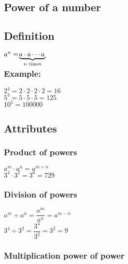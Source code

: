 \documentclass[a4paper]{article}
\begin{document}
\begin{Large}

\section*{Power of a number}

\subsection*{Definition}

$a^n = \smash[b]{\! \underbrace{a \cdot a \cdots{a}\,}_\text{$n$ times}}$

\subsubsection*{Example:}

$2^4 = 2 \cdot 2 \cdot 2 \cdot 2 = 16$ \\[0.05cm]

\noindent $5^3 = 5 \cdot 5 \cdot 5 = 125$ \\[0.05cm]

\noindent $10^5 = 100000$

\subsection*{Attributes}

\subsubsection*{Product of powers}

$a^m \cdot a^n = a^{m+n}$ \\[0.05cm]

\noindent $3^4 \cdot 3^2 = 3^6 = 729$

\subsubsection*{Division of powers}

$a^m \div a^n = \dfrac{a^m}{a^n} = a^{m-n}$ \\[0.05cm]

\noindent $3^4 \div 3^2 = \dfrac{3^4}{3^2} = 3^2 = 9$

\subsubsection*{Multiplication power of power}


\end{Large}
\end{document}
